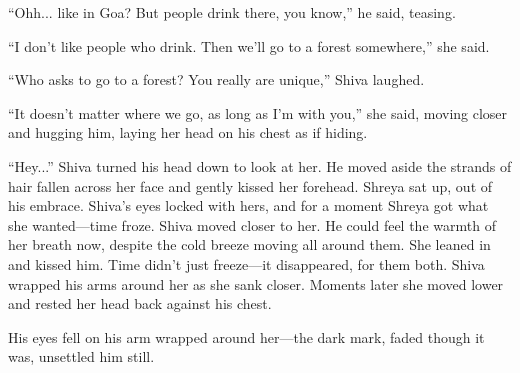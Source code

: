 ``Ohh... like in Goa? But people drink there, you know,'' he said, teasing.

``I don't like people who drink. Then we'll go to a forest somewhere,'' she said.

``Who asks to go to a forest? You really are unique,'' Shiva laughed.

``It doesn't matter where we go, as long as I'm with you,'' she said, moving closer and hugging him, laying her head on his chest as if hiding.

``Hey...'' Shiva turned his head down to look at her. He moved aside the strands of hair fallen across her face and gently kissed her forehead. Shreya sat up, out of his embrace. Shiva's eyes locked with hers, and for a moment Shreya got what she wanted—time froze. Shiva moved closer to her. He could feel the warmth of her breath now, despite the cold breeze moving all around them. She leaned in and kissed him. Time didn't just freeze—it disappeared, for them both. Shiva wrapped his arms around her as she sank closer. Moments later she moved lower and rested her head back against his chest.

His eyes fell on his arm wrapped around her—the dark mark, faded though it was, unsettled him still. 